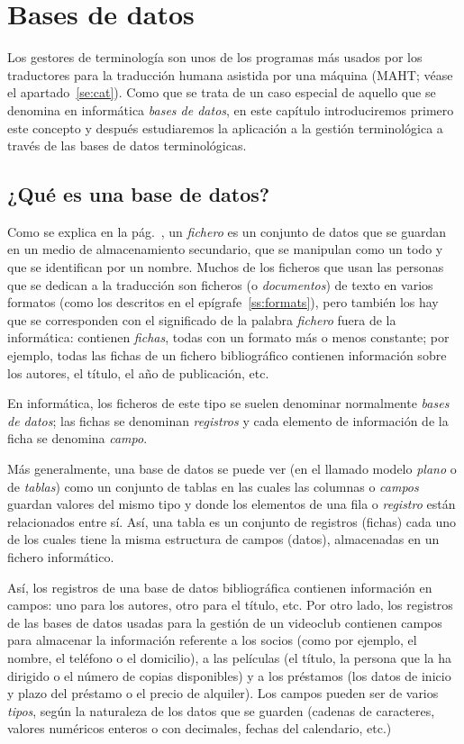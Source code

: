 \chapter{Bases de datos} \label{se:basesdades} 

Los gestores de terminología son unos de los programas más usados por los traductores para la traducción humana asistida por una máquina (MAHT; véase el apartado~\ref{se:cat}). Como que se trata de un caso especial de aquello que se denomina en informática \emph{bases de datos}, en este capítulo introduciremos primero este concepto y después estudiaremos la aplicación a la gestión terminológica a través de las bases de datos terminológicas. 

\section{¿Qué es una base de datos?} 

Como se explica en la pág.~\pageref{pg:fitxer}, un \emph{fichero} es un conjunto de datos que se guardan en un medio de almacenamiento secundario, que se manipulan como un todo y que se identifican por un nombre. Muchos de los ficheros que usan las personas que se dedican a la traducción son ficheros (o \emph{documentos}) de texto en varios formatos (como los descritos en el epígrafe~\ref{ss:formats}), pero también los hay que se corresponden con el significado de la palabra \emph{fichero} fuera de la informática: contienen \emph{fichas}, todas con un formato más o menos constante; por ejemplo, todas las fichas de un fichero bibliográfico contienen información sobre los autores, el título, el año de publicación, etc. 

En informática, los ficheros de este tipo se suelen denominar normalmente \emph{bases de datos}; las fichas se denominan \emph{registros} y cada elemento de información de la ficha se denomina \emph{campo}. 

Más generalmente, una base de datos se puede ver (en el llamado modelo \emph{plano} o de \emph{tablas}) como un conjunto de tablas en las cuales las columnas o \emph{campos} guardan valores del mismo tipo y donde los elementos de una fila o \emph{registro} están relacionados entre sí. Así, una tabla es un conjunto de registros (fichas) cada uno de los cuales tiene la misma estructura de campos (datos), almacenadas en un fichero informático. 

Así, los registros de una base de datos bibliográfica contienen información en campos: uno para los autores, otro para el título, etc. Por otro lado, los registros de las bases de datos usadas para la gestión de un videoclub contienen campos para almacenar la información referente a los socios (como por ejemplo, el nombre, el teléfono o el domicilio), a las películas (el título, la persona que la ha dirigido o el número de copias disponibles) y a los préstamos (los datos de inicio y plazo del préstamo o el precio de alquiler). Los campos pueden ser de varios \emph{tipos}, según la naturaleza de los datos que se guarden (cadenas de caracteres, valores numéricos enteros o con decimales, fechas del calendario, etc.) 

